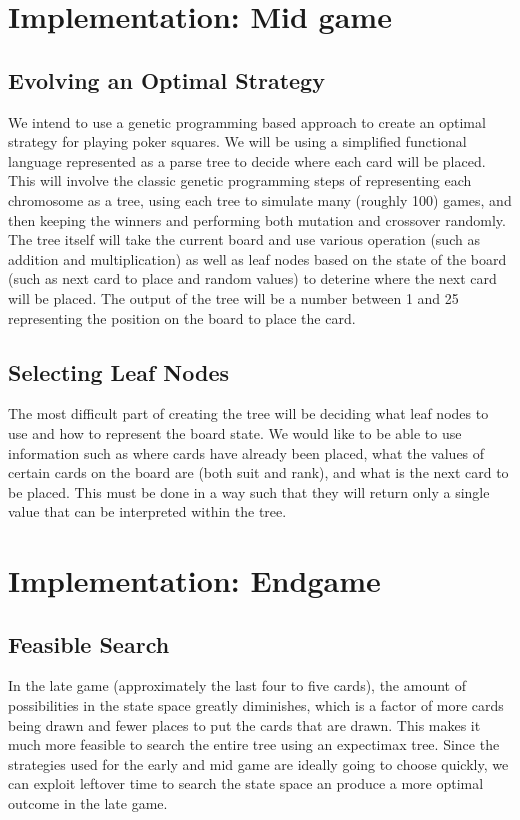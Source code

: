 \documentclass[twoside]{article}
\begin{document}
\begin{multicols}{2}
\section{Implementation: Mid game}

\subsection{Evolving an Optimal Strategy}
We intend to use a genetic programming based approach to create an optimal strategy for playing poker squares. We will be using a simplified functional language represented as a parse tree to decide where each card will be placed. This will involve the classic genetic programming steps of representing each chromosome as a tree, using each tree to simulate many (roughly 100) games, and then keeping the winners and performing both mutation and crossover randomly. The tree itself will take the current board and use various operation (such as addition and multiplication) as well as leaf nodes based on the state of the board (such as next card to place and random values) to deterine where the next card will be placed. The output of the tree will be a number between 1 and 25 representing the position on the board to place the card.

\subsection{Selecting Leaf Nodes}
The most difficult part of creating the tree will be deciding what leaf nodes to use and how to represent the board state. We would like to be able to use information such as where cards have already been placed, what the values of certain cards on the board are (both suit and rank), and what is the next card to be placed. This must be done in a way such that they will return only a single value that can be interpreted within the tree.


\section{Implementation: Endgame}
\subsection{Feasible Search}

In the late game (approximately the last four to five cards), the amount of possibilities in the state space greatly diminishes, which is a factor of more cards being drawn and fewer places to put the cards that are drawn. This makes it much more feasible to search the entire tree using an expectimax tree. Since the strategies used for the early and mid game are ideally going to choose quickly, we can exploit leftover time to search the state space an produce a more optimal outcome in the late game.


\end{multicols}
\end{document}
